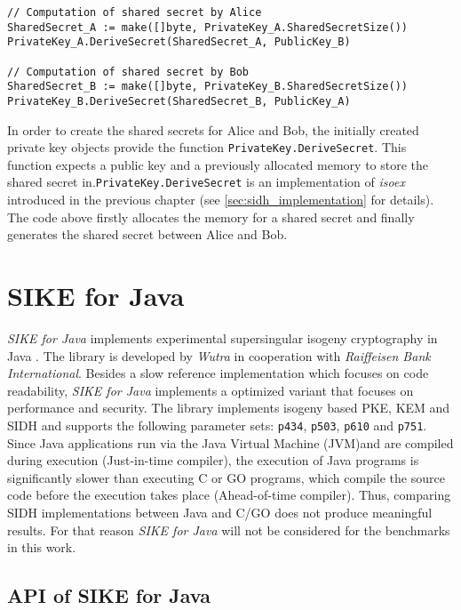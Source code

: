\begin{lstlisting}[]
// Computation of shared secret by Alice
SharedSecret_A := make([]byte, PrivateKey_A.SharedSecretSize())
PrivateKey_A.DeriveSecret(SharedSecret_A, PublicKey_B)

// Computation of shared secret by Bob
SharedSecret_B := make([]byte, PrivateKey_B.SharedSecretSize())
PrivateKey_B.DeriveSecret(SharedSecret_B, PublicKey_A)
\end{lstlisting}
In order to create the shared secrets for Alice and Bob, the initially created private key objects provide the function \texttt{PrivateKey.DeriveSecret}. This function expects a public key and a previously allocated memory to store the shared secret in.\texttt{PrivateKey.DeriveSecret} is an implementation of \textit{isoex} introduced in the previous chapter (see \autoref{sec:sidh_implementation} for details).\\ 
The code above firstly allocates the memory for a shared secret and finally generates the shared secret between Alice and Bob.

\section{SIKE for Java}
\textit{SIKE for Java} implements experimental supersingular isogeny cryptography in Java \parencite{SikeForJava2020github}. The library is developed by \textit{Wutra} in cooperation with \textit{Raiffeisen Bank International}. Besides a slow reference implementation which focuses on code readability, \textit{SIKE for Java} implements a optimized variant that focuses on performance and security. The library implements isogeny based \gls{PKE}, \gls{KEM} and \gls{SIDH} and supports the following parameter sets: \texttt{p434}, \texttt{p503}, \texttt{p610} and \texttt{p751}.\\
Since Java applications run via the Java Virtual Machine (\gls{JVM})and are compiled during execution (Just-in-time compiler), the execution of Java programs is significantly slower than  executing C or GO programs, which compile the source code before the execution takes place (Ahead-of-time compiler). Thus, comparing SIDH implementations between Java and C/GO does not produce meaningful results. For that reason \textit{SIKE for Java} will not be considered for the benchmarks in this work.

\subsection{API of SIKE for Java}

